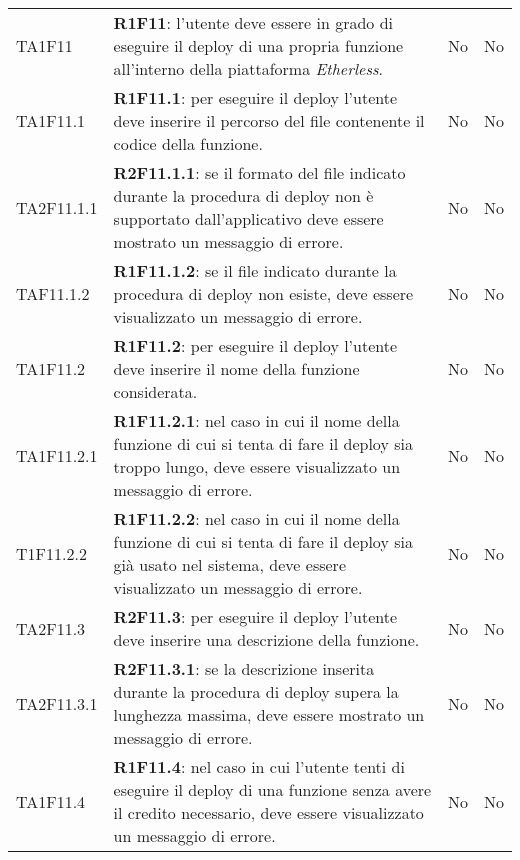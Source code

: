 \begin{longtable}{
		>{\centering}p{} 
		>{}p{}
		>{\centering}p{}
		>{\centering}p{} }
	TA1F11 		& \textbf{R1F11}: l'utente deve essere in grado di eseguire il deploy\ped{\textit{G}} di una propria funzione all'interno della piattaforma \textit{Etherless}. 							& No & No \tabularnewline
	TA1F11.1 	& \textbf{R1F11.1}: per eseguire il deploy\ped{\textit{G}} l'utente deve inserire il percorso del file contenente il codice della funzione. 												& No & No \tabularnewline
	TA2F11.1.1 	& \textbf{R2F11.1.1}: se il formato del file indicato durante la procedura di deploy\ped{\textit{G}} non è supportato dall'applicativo deve essere mostrato un messaggio di errore.			& No & No \tabularnewline
	TAF11.1.2 	& \textbf{R1F11.1.2}: se il file indicato durante la procedura di deploy\ped{\textit{G}} non esiste, deve essere visualizzato un messaggio di errore.										& No & No \tabularnewline
	TA1F11.2 	& \textbf{R1F11.2}: per eseguire il deploy\ped{\textit{G}} l'utente deve inserire il nome della funzione considerata. 																		& No & No \tabularnewline
	TA1F11.2.1 	& \textbf{R1F11.2.1}: nel caso in cui il nome della funzione di cui si tenta di fare il deploy\ped{\textit{G}} sia troppo lungo, deve essere visualizzato un messaggio di errore. 			& No & No \tabularnewline
	T1F11.2.2 	& \textbf{R1F11.2.2}: nel caso in cui il nome della funzione di cui si tenta di fare il deploy\ped{\textit{G}} sia già usato nel sistema, deve essere visualizzato un messaggio di errore.	& No & No \tabularnewline
	TA2F11.3 	& \textbf{R2F11.3}: per eseguire il deploy\ped{\textit{G}} l'utente deve inserire una descrizione della funzione. 																			& No & No \tabularnewline
	TA2F11.3.1 	& \textbf{R2F11.3.1}: se la descrizione inserita durante la procedura di deploy\ped{\textit{G}} supera la lunghezza massima, deve essere mostrato un messaggio di errore. 					& No & No \tabularnewline
	TA1F11.4 	& \textbf{R1F11.4}: nel caso in cui l'utente tenti di eseguire il deploy\ped{\textit{G}} di una funzione senza avere il credito necessario, deve essere visualizzato un messaggio di errore. & No & No \tabularnewline


\end{longtable}

